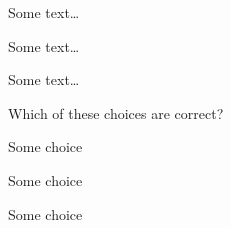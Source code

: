 \documentclass[UKenglish]{uioexam}
\begin{document}

Some text\ldots


Some text\ldots


Some text\ldots


Which of these choices are correct?

\begin{choicelist}[]
    \choice
    Some choice

    \choice
    Some choice

    \choice
    Some choice
\end{choicelist}
\end{document}
